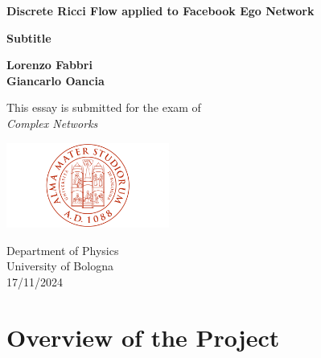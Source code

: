 \documentclass[a4paper,12pt,twoside,online,customfont,custombib,PageStyleI,draftclassic]{Settings/PhDThesisPSnPDF}
\begin{document}
\begin{titlepage}
    \begin{center}
        \vspace*{1cm}
            
        \Huge
        \textbf{Discrete Ricci Flow applied to Facebook Ego Network}
            
        \vspace{0.5cm}
        \large
        \textbf{Subtitle}
            
        \vspace{1.5cm}
        \Large    
        \textbf{Lorenzo Fabbri \\ Giancarlo Oancia}
            
        \vfill
        \large   
        This essay is submitted for the exam of\\
        \textit{Complex Networks}
            
        \vspace{0.8cm}
            
        \includegraphics[width=0.4\textwidth]{Graphics/UniversityCrest.png}
            
        \large
        Department of Physics\\
        University of Bologna\\
        17/11/2024
            
    \end{center}
\end{titlepage}

\frontmatter



\begin{spacing}{1.3}
    \tableofcontents
\end{spacing}

\mainmatter
\chapter{Overview of the Project}

\end{document}

